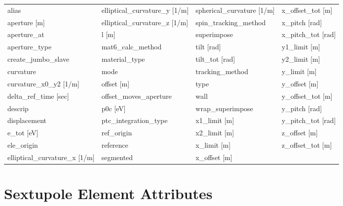  \begin{tabular}{llll} \toprule
alias                            & elliptical_curvature_y [1/m]     & spherical_curvature [1/m]        & x_offset_tot [m]                 \\
aperture [m]                     & elliptical_curvature_z [1/m]     & spin_tracking_method             & x_pitch [rad]                    \\
aperture_at                      & l [m]                            & superimpose                      & x_pitch_tot [rad]                \\
aperture_type                    & mat6_calc_method                 & tilt [rad]                       & y1_limit [m]                     \\
create_jumbo_slave               & material_type                    & tilt_tot [rad]                   & y2_limit [m]                     \\
curvature                        & mode                             & tracking_method                  & y_limit [m]                      \\
curvature_x0_y2 [1/m]            & offset [m]                       & type                             & y_offset [m]                     \\
delta_ref_time [sec]             & offset_moves_aperture            & wall                             & y_offset_tot [m]                 \\
descrip                          & p0c [eV]                         & wrap_superimpose                 & y_pitch [rad]                    \\
displacement                     & ptc_integration_type             & x1_limit [m]                     & y_pitch_tot [rad]                \\
e_tot [eV]                       & ref_origin                       & x2_limit [m]                     & z_offset [m]                     \\
ele_origin                       & reference                        & x_limit [m]                      & z_offset_tot [m]                 \\
elliptical_curvature_x [1/m]     & segmented                        & x_offset [m]                     &                                  \\
 \bottomrule
 \end{tabular}
 \vfill
 
 \section{Sextupole Element Attributes}
 \label{s:list.sextupole}
 
